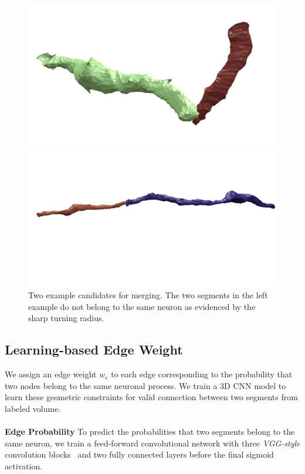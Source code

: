 \begin{figure}[t]
	\begin{minipage}{0.45\linewidth}
		\includegraphics[width=\linewidth]{./figures/constraint_error.png}
	\end{minipage}
	\hfill
	\begin{minipage}{0.45\linewidth}
		\includegraphics[width=\linewidth]{./figures/constraint_success.png}
	\end{minipage}
	\caption{Two example candidates for merging. The two segments in the left example do not belong to the same neuron as evidenced by the sharp turning radius.}
	\label{fig:turn-radii}
\end{figure}
\subsection{Learning-based Edge Weight}
\label{sec:edge-weights}
We assign an edge weight $w_e$ to each edge corresponding to the probability that two nodes belong to the same neuronal process.
We train a 3D CNN model to learn these geometric constraints for valid connection between two segments from labeled volume.
\\~\\
\noindent\textbf{Edge Probability}
To predict the probabilities that two segments belong to the same neuron, we train a feed-forward convolutional network with three \textit{VGG-style} convolution blocks~\cite{chatfield2014return} and two fully connected layers before the final sigmoid activation. 

